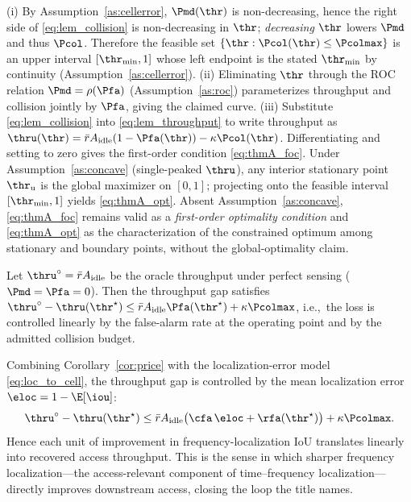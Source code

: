 \begin{IEEEproof}
(i) By Assumption~\ref{as:cellerror}, $\Pmd(\thr)$ is non-decreasing, hence
the right side of \eqref{eq:lem_collision} is non-decreasing in $\thr$;
\emph{decreasing} $\thr$ lowers $\Pmd$ and thus $\Pcol$. Therefore the
feasible set $\{\thr:\Pcol(\thr)\le\Pcolmax\}$ is an upper interval
$[\thr_{\min},1]$ whose left endpoint is the stated $\thr_{\min}$ by
continuity (Assumption~\ref{as:cellerror}).
(ii) Eliminating $\thr$ through the ROC relation $\Pmd=\rho(\Pfa)$
(Assumption~\ref{as:roc}) parameterizes throughput and collision jointly by
$\Pfa$, giving the claimed curve.
(iii) Substitute \eqref{eq:lem_collision} into \eqref{eq:lem_throughput} to
write throughput as $\thru(\thr)=\bar r A_{\mathrm{idle}}(1-\Pfa(\thr))
-\kappa\Pcol(\thr)$. Differentiating and setting to zero gives the
first-order condition \eqref{eq:thmA_foc}. Under
Assumption~\ref{as:concave} (single-peaked $\thru$), any interior stationary
point $\thr_{\mathrm u}$ is the global maximizer on $[0,1]$; projecting onto
the feasible interval $[\thr_{\min},1]$ yields \eqref{eq:thmA_opt}. Absent
Assumption~\ref{as:concave}, \eqref{eq:thmA_foc} remains valid as a
\emph{first-order optimality condition} and \eqref{eq:thmA_opt} as the
characterization of the constrained optimum among stationary and boundary
points, without the global-optimality claim.
\end{IEEEproof}

\begin{corollary}
\label{cor:price}
Let $\thru^{\circ}=\bar r A_{\mathrm{idle}}$ be the oracle throughput under
perfect sensing ($\Pmd=\Pfa=0$). Then the throughput gap satisfies
$\thru^{\circ}-\thru(\thr^{\star})\le
\bar r A_{\mathrm{idle}}\Pfa(\thr^{\star})+\kappa\Pcolmax$, i.e.,\ the loss is
controlled linearly by the false-alarm rate at the operating point and by
the admitted collision budget.
\end{corollary}

\begin{corollary}
\label{cor:loc}
Combining Corollary~\ref{cor:price} with the localization-error model
\eqref{eq:loc_to_cell}, the throughput gap is controlled by the mean
localization error $\eloc=1-\E[\iou]$:
\begin{equation}
\thru^{\circ}-\thru(\thr^{\star})\le
\bar r A_{\mathrm{idle}}\bigl(\cfa\,\eloc+\rfa(\thr^{\star})\bigr)
+\kappa\Pcolmax .
\label{eq:loc_gap}
\end{equation}
Hence each unit of improvement in frequency-localization IoU translates
linearly into recovered access throughput. This is the sense in which sharper
frequency localization---the access-relevant component of time--frequency
localization---directly improves downstream access, closing the loop the
title names.
\end{corollary}

